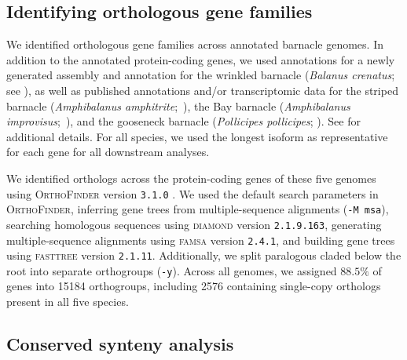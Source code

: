 \subsection*{Identifying orthologous gene families}\label{sec:methods_orthologs}

We identified orthologous gene families across annotated barnacle genomes. In
addition to the \bgla{} annotated protein-coding genes, we used annotations for
a newly generated assembly and annotation for the wrinkled barnacle
(\textit{Balanus crenatus}; see ), as well as
published annotations and/or transcriptomic data for the striped barnacle
(\textit{Amphibalanus amphitrite};~\citealp{han_new_2024,kim_draft_2019}), the
Bay barnacle (\textit{Amphibalanus improvisus};~\citealp{bishop_genome_2025}),
and the gooseneck barnacle (\textit{Pollicipes pollicipes};
\citealp{bernot_chromosome-level_2022}).
See  for additional details.
For all species, we used the longest isoform as representative for each gene for
all downstream analyses.
\vspace{0.1cm}

We identified orthologs across the protein-coding genes of these five genomes using
\textsc{OrthoFinder} version \texttt{3.1.0} \citep{emms_orthofinder_2015,
emms_orthofinder_2019,emms_orthofinder_2025}. We used the default search parameters
in \textsc{OrthoFinder}, inferring gene trees from multiple-sequence alignments
(\texttt{-M msa}), searching homologous sequences using \textsc{diamond} version
\texttt{2.1.9.163}, generating multiple-sequence alignments using \textsc{famsa}
version \texttt{2.4.1}, and building gene trees using \textsc{fasttree} version
\texttt{2.1.11}. Additionally, we split paralogous claded below the root into
separate orthogroups (\texttt{-y}). Across all genomes, we assigned $88.5\%$ of
genes into \num{15184} orthogroups, including \num{2576} containing single-copy orthologs
present in all five species.

\subsection*{Conserved synteny analysis}

